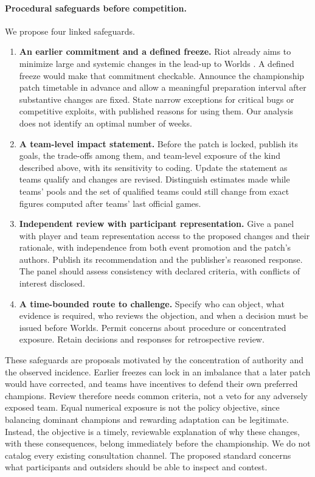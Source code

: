 \documentclass[11pt]{article}
\begin{document}
\paragraph{Procedural safeguards before competition.} We propose four linked safeguards.
\begin{enumerate}
\item \textbf{An earlier commitment and a defined freeze.} Riot already aims to minimize large and systemic changes in the lead-up to Worlds \citep{riot2020proplay}. A defined freeze would make that commitment checkable. Announce the championship patch timetable in advance and allow a meaningful preparation interval after substantive changes are fixed. State narrow exceptions for critical bugs or competitive exploits, with published reasons for using them. Our analysis does not identify an optimal number of weeks.
\item \textbf{A team-level impact statement.} Before the patch is locked, publish its goals, the trade-offs among them, and team-level exposure of the kind described above, with its sensitivity to coding. Update the statement as teams qualify and changes are revised. Distinguish estimates made while teams' pools and the set of qualified teams could still change from exact figures computed after teams' last official games.
\item \textbf{Independent review with participant representation.} Give a panel with player and team representation access to the proposed changes and their rationale, with independence from both event promotion and the patch's authors. Publish its recommendation and the publisher's reasoned response. The panel should assess consistency with declared criteria, with conflicts of interest disclosed.
\item \textbf{A time-bounded route to challenge.} Specify who can object, what evidence is required, who reviews the objection, and when a decision must be issued before Worlds. Permit concerns about procedure or concentrated exposure. Retain decisions and responses for retrospective review.
\end{enumerate}

These safeguards are proposals motivated by the concentration of authority and the observed incidence. Earlier freezes can lock in an imbalance that a later patch would have corrected, and teams have incentives to defend their own preferred champions. Review therefore needs common criteria, not a veto for any adversely exposed team. Equal numerical exposure is not the policy objective, since balancing dominant champions and rewarding adaptation can be legitimate. Instead, the objective is a timely, reviewable explanation of why these changes, with these consequences, belong immediately before the championship. We do not catalog every existing consultation channel. The proposed standard concerns what participants and outsiders should be able to inspect and contest.
\end{document}
